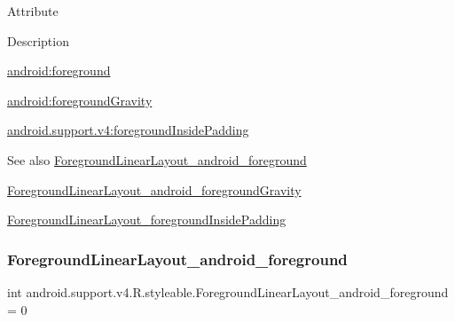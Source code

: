 Attribute

Description 

{\ttfamily \hyperlink{classandroid_1_1support_1_1v4_1_1R_1_1styleable_ab7909de85d8b7161fc9132afdb9f0807}{android\+:foreground}}

{\ttfamily \hyperlink{classandroid_1_1support_1_1v4_1_1R_1_1styleable_adfb8b15836c97c4558927711664009e7}{android\+:foreground\+Gravity}}

{\ttfamily \hyperlink{classandroid_1_1support_1_1v4_1_1R_1_1styleable_afc40e43edb351c309af23e1c6b1d91c9}{android.\+support.\+v4\+:foreground\+Inside\+Padding}}

\begin{DoxySeeAlso}{See also}
\hyperlink{classandroid_1_1support_1_1v4_1_1R_1_1styleable_ab7909de85d8b7161fc9132afdb9f0807}{Foreground\+Linear\+Layout\+\_\+android\+\_\+foreground} 

\hyperlink{classandroid_1_1support_1_1v4_1_1R_1_1styleable_adfb8b15836c97c4558927711664009e7}{Foreground\+Linear\+Layout\+\_\+android\+\_\+foreground\+Gravity} 

\hyperlink{classandroid_1_1support_1_1v4_1_1R_1_1styleable_afc40e43edb351c309af23e1c6b1d91c9}{Foreground\+Linear\+Layout\+\_\+foreground\+Inside\+Padding} 
\end{DoxySeeAlso}
\mbox{\label{classandroid_1_1support_1_1v4_1_1R_1_1styleable_ab7909de85d8b7161fc9132afdb9f0807}} 
\subsubsection{\texorpdfstring{Foreground\+Linear\+Layout\+\_\+android\+\_\+foreground}{ForegroundLinearLayout\_android\_foreground}}
{\footnotesize\ttfamily int android.\+support.\+v4.\+R.\+styleable.\+Foreground\+Linear\+Layout\+\_\+android\+\_\+foreground = 0\hspace{0.3cm}{\ttfamily [static]}}


